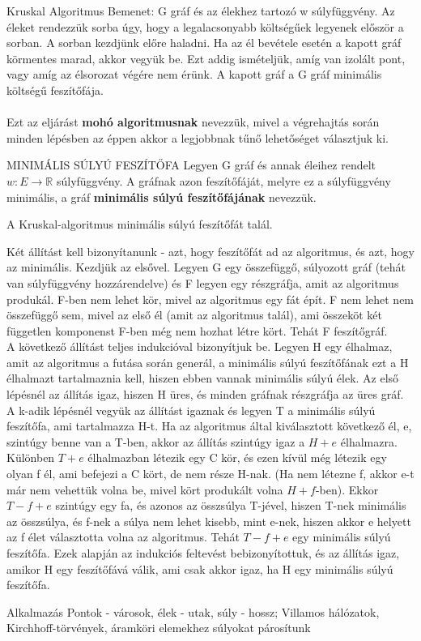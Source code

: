 \begin{tetel}{Kruskal Algoritmus}
Bemenet: G gráf és az élekhez tartozó w súlyfüggvény. Az éleket rendezzük sorba úgy, hogy a legalacsonyabb költségűek legyenek először a sorban. A sorban kezdjünk előre haladni. Ha az él bevétele esetén a kapott gráf körmentes marad, akkor vegyük be. Ezt addig ismételjük, amíg van izolált pont, vagy amíg az élsorozat végére nem érünk. A kapott gráf a G gráf minimális költségű feszítőfája.
\\
\\
Ezt az eljárást \textbf{mohó algoritmusnak} nevezzük, mivel a végrehajtás során minden lépésben az éppen akkor a legjobbnak tűnő lehetőséget választjuk ki.
\end{tetel}

\begin{definicio}{MINIMÁLIS SÚLYÚ FESZÍTŐFA}
Legyen G gráf és annak éleihez rendelt $w: E \rightarrow \mathbb{R}$ súlyfüggvény. A gráfnak azon feszítőfáját, melyre ez a súlyfüggvény minimális, a gráf \textbf{minimális súlyú feszítőfájának} nevezzük.
\end{definicio}

\begin{tetel}{}
A Kruskal-algoritmus minimális súlyú feszítőfát talál.
\end{tetel}

\begin{bizonyitas}{}
Két állítást kell bizonyítanunk - azt, hogy feszítőfát ad az algoritmus, és azt, hogy az minimális. Kezdjük az elsővel. Legyen G egy összefüggő, súlyozott gráf (tehát van súlyfüggvény hozzárendelve) és F legyen egy részgráfja, amit az algoritmus produkál. F-ben nem lehet kör, mivel az algoritmus egy fát épít. F nem lehet nem összefüggő sem, mivel az első él (amit az algoritmus talál), ami összeköt két független komponenst F-ben még nem hozhat létre kört. Tehát F feszítőgráf.
\\
A következő állítást teljes indukcióval bizonyítjuk be. Legyen H egy élhalmaz, amit az algoritmus a futása során generál, a minimális súlyú feszítőfának ezt a H élhalmazt tartalmaznia kell, hiszen ebben vannak minimális súlyú élek.
Az első lépésnél az állítás igaz, hiszen H üres, és minden gráfnak részgráfja az üres gráf. A k-adik lépésnél vegyük az állítást igaznak és legyen T a minimális súlyú feszítőfa, ami tartalmazza H-t. Ha az algoritmus által kiválasztott következő él, e, szintúgy benne van a T-ben, akkor az állítás szintúgy igaz a $H + {e}$ élhalmazra. Különben $T + {e}$ élhalmazban létezik egy C kör, és ezen kívül még létezik egy olyan f él, ami befejezi a C kört, de nem része H-nak. (Ha nem létezne f, akkor e-t már nem vehettük volna be, mivel kört produkált volna $H + f$-ben). Ekkor $T - {f} + {e}$ szintúgy egy fa, és azonos az összsúlya T-jével, hiszen T-nek minimális az összsúlya, és f-nek a súlya nem lehet kisebb, mint e-nek, hiszen akkor e helyett az f élet választotta volna az algoritmus. Tehát $T - {f} + {e}$ egy minimális súlyú feszítőfa. Ezek alapján az indukciós feltevést bebizonyítottuk, és az állítás igaz, amikor H egy feszítőfává válik, ami csak akkor igaz, ha H egy minimális súlyú feszítőfa.
\end{bizonyitas}

\begin{tetel}{Alkalmazás}
Pontok - városok, élek - utak, súly - hossz; Villamos hálózatok, Kirchhoff-törvények, áramköri elemekhez súlyokat párosítunk
\end{tetel}
